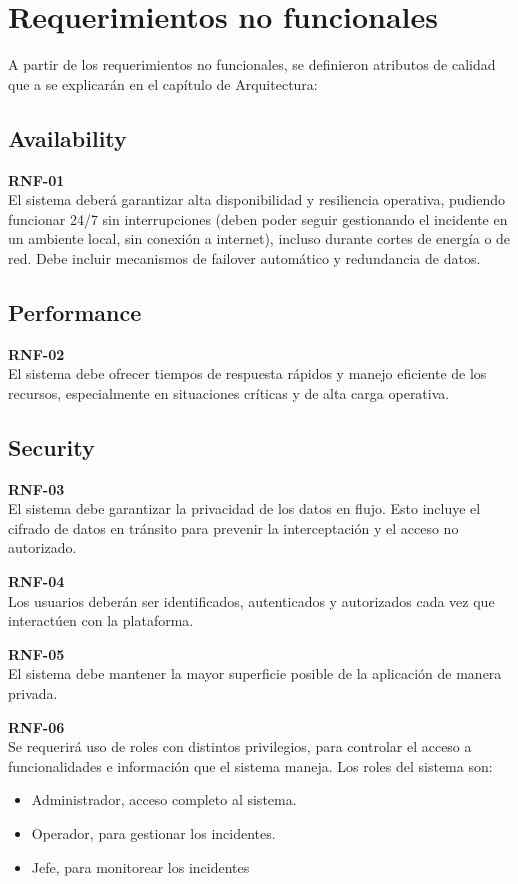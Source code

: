 \section{Requerimientos no funcionales}\label{sec:requerimientosNoFuncionales}

A partir de los requerimientos no funcionales, se definieron atributos de calidad que a se explicarán en el capítulo de Arquitectura: 

\subsection{Availability}

\textbf{RNF-01}\\
El sistema deberá garantizar alta disponibilidad y resiliencia operativa, pudiendo funcionar 24/7 sin interrupciones (deben poder seguir gestionando el incidente en un ambiente local, 
sin conexión a internet), incluso durante cortes de energía o de red. Debe incluir mecanismos de failover automático y redundancia de datos.


\subsection{Performance}

\textbf{RNF-02}\\
El sistema debe ofrecer tiempos de respuesta rápidos y manejo eficiente de los recursos, especialmente en situaciones críticas y de alta carga operativa.


\subsection{Security}

\textbf{RNF-03}\\
El sistema debe garantizar la privacidad de los datos en flujo. Esto incluye el cifrado de datos en tránsito para prevenir la interceptación y el acceso no autorizado.

\textbf{RNF-04}\\
Los usuarios deberán ser identificados, autenticados y autorizados cada vez que interactúen con la plataforma.

\textbf{RNF-05}\\
El sistema debe mantener la mayor superficie posible de la aplicación de manera privada.

\textbf{RNF-06}\\
Se requerirá uso de roles con distintos privilegios, para controlar el acceso a funcionalidades e información que el sistema maneja. Los roles del sistema son:
\begin{itemize}
    \item Administrador, acceso completo al sistema.
    \item Operador, para gestionar los incidentes.
    \item Jefe, para monitorear los incidentes
\end{itemize}


